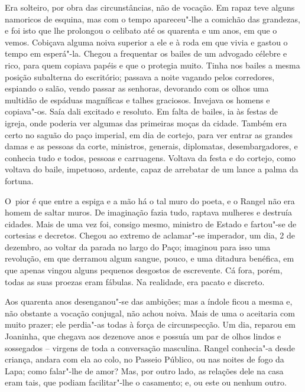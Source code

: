 Era solteiro, por obra das circunstâncias, não de vocação. Em rapaz teve
alguns namoricos de esquina, mas com o tempo apareceu"-lhe a comichão das
grandezas, e foi isto que lhe prolongou o celibato até os quarenta e um
anos, em que o vemos. Cobiçava alguma noiva superior a ele e à roda em
que vivia e gastou o tempo em esperá"-la. Chegou a frequentar os bailes
de um advogado célebre e rico, para quem copiava papéis e que o protegia
muito. Tinha nos bailes a mesma posição subalterna do escritório;
passava a noite vagando pelos corredores, espiando o salão, vendo passar
as senhoras, devorando com os olhos uma multidão de espáduas magníficas
e talhes graciosos. Invejava os homens e copiava"-os. Saía dali excitado
e resoluto. Em falta de bailes, ia às festas de igreja, onde poderia ver
algumas das primeiras moças da cidade. Também era certo no saguão do
paço imperial, em dia de cortejo, para ver entrar as grandes damas e as
pessoas da corte, ministros, generais, diplomatas, desembargadores, e
conhecia tudo e todos, pessoas e carruagens. Voltava da festa e do
cortejo, como voltava do baile, impetuoso, ardente, capaz de arrebatar
de um lance a palma da fortuna.

O~pior é que entre a espiga e a mão há o tal muro do poeta, e o Rangel
não era homem de saltar muros. De imaginação fazia tudo, raptava
mulheres e destruía cidades. Mais de uma vez foi, consigo mesmo,
ministro de Estado e fartou"-se de cortesias e decretos. Chegou ao
extremo de aclamar"-se imperador, um dia, 2 de dezembro, ao voltar da
parada no largo do Paço; imaginou para isso uma revolução, em que
derramou algum sangue, pouco, e uma ditadura benéfica, em que apenas
vingou alguns pequenos desgostos de escrevente. Cá fora, porém, todas as
suas proezas eram fábulas. Na realidade, era pacato e discreto.

Aos quarenta anos desenganou"-se das ambições; mas a índole ficou a mesma
e, não obstante a vocação conjugal, não achou noiva. Mais de uma o
aceitaria com muito prazer; ele perdia"-as todas à força de
circunspecção. Um dia, reparou em Joaninha, que chegava aos dezenove
anos e possuía um par de olhos lindos e sossegados -- virgens de toda a
conversação masculina. Rangel conhecia"-a desde criança, andara com ela
ao colo, no Passeio Público, ou nas noites de fogo da Lapa; como
falar"-lhe de amor? Mas, por outro lado, as relações dele na casa eram
tais, que podiam facilitar"-lhe o casamento; e, ou este ou nenhum outro.

